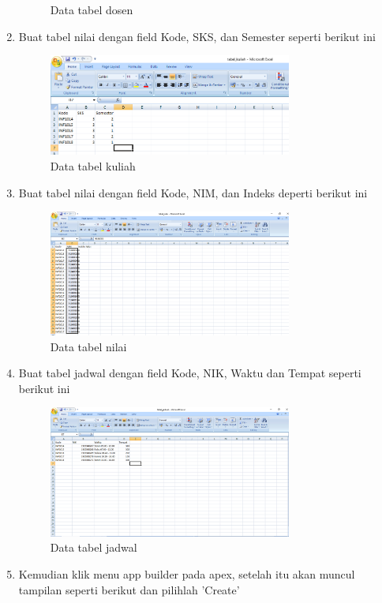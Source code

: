 \begin{enumerate}
\begin{figure}[H]
				\centering
				\caption{Data tabel dosen}
				\end{figure}
    \item Buat tabel nilai dengan field Kode, SKS, dan Semester seperti berikut ini
                \begin{figure}[H]
				\includegraphics[width=8cm]{figures/tabelkuliah.PNG}
				\centering
				\caption{Data tabel kuliah}
				\end{figure}
    \item Buat tabel nilai dengan field Kode, NIM, dan Indeks deperti berikut ini
                \begin{figure}[H]
				\includegraphics[width=8cm]{figures/tabelnilai.PNG}
				\centering
				\caption{Data tabel nilai}
				\end{figure}
	\item Buat tabel jadwal dengan field Kode, NIK, Waktu dan Tempat seperti berikut ini
	            \begin{figure}[H]
				\includegraphics[width=8cm]{figures/tabeljadwal.PNG}
				\centering
				\caption{Data tabel jadwal}
				\end{figure}
	\item Kemudian klik menu app builder pada apex, setelah itu akan muncul tampilan seperti berikut dan pilihlah 'Create'
				\begin{figure}[H]

\end{figure}
\end{enumerate}

